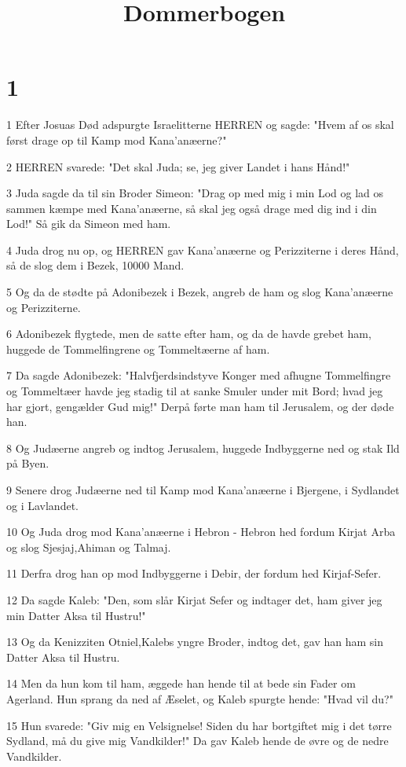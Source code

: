 

\title{Dommerbogen}


\chapter{1}

\par 1 Efter Josuas Død adspurgte Israelitterne HERREN og sagde: "Hvem af os skal først drage op til Kamp mod Kana'anæerne?"
\par 2 HERREN svarede: "Det skal Juda; se, jeg giver Landet i hans Hånd!"
\par 3 Juda sagde da til sin Broder Simeon: "Drag op med mig i min Lod og lad os sammen kæmpe med Kana'anæerne, så skal jeg også drage med dig ind i din Lod!" Så gik da Simeon med ham.
\par 4 Juda drog nu op, og HERREN gav Kana'anæerne og Perizziterne i deres Hånd, så de slog dem i Bezek, 10000 Mand.
\par 5 Og da de stødte på Adonibezek i Bezek, angreb de ham og slog Kana'anæerne og Perizziterne.
\par 6 Adonibezek flygtede, men de satte efter ham, og da de havde grebet ham, huggede de Tommelfingrene og Tommeltæerne af ham.
\par 7 Da sagde Adonibezek: "Halvfjerdsindstyve Konger med afhugne Tommelfingre og Tommeltæer havde jeg stadig til at sanke Smuler under mit Bord; hvad jeg har gjort, gengælder Gud mig!" Derpå førte man ham til Jerusalem, og der døde han.
\par 8 Og Judæerne angreb og indtog Jerusalem, huggede Indbyggerne ned og stak Ild på Byen.
\par 9 Senere drog Judæerne ned til Kamp mod Kana'anæerne i Bjergene, i Sydlandet og i Lavlandet.
\par 10 Og Juda drog mod Kana'anæerne i Hebron - Hebron hed fordum Kirjat Arba og slog Sjesjaj,Ahiman og Talmaj.
\par 11 Derfra drog han op mod Indbyggerne i Debir, der fordum hed Kirjaf-Sefer.
\par 12 Da sagde Kaleb: "Den, som slår Kirjat Sefer og indtager det, ham giver jeg min Datter Aksa til Hustru!"
\par 13 Og da Kenizziten Otniel,Kalebs yngre Broder, indtog det, gav han ham sin Datter Aksa til Hustru.
\par 14 Men da hun kom til ham, æggede han hende til at bede sin Fader om Agerland. Hun sprang da ned af Æselet, og Kaleb spurgte hende: "Hvad vil du?"
\par 15 Hun svarede: "Giv mig en Velsignelse! Siden du har bortgiftet mig i det tørre Sydland, må du give mig Vandkilder!" Da gav Kaleb hende de øvre og de nedre Vandkilder.
